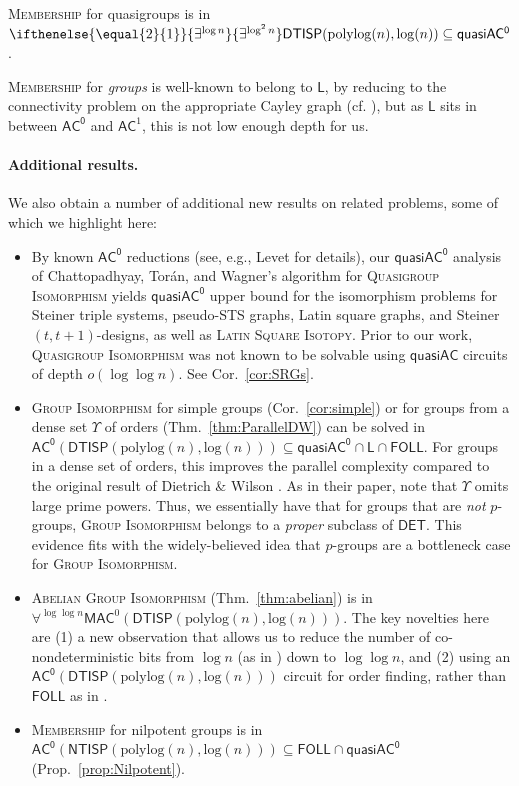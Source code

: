 \documentclass{theoretics}
\newcommand{\algprobm}[1]{\textsc{#1}\xspace}
\newcommand{\betacc}[1]{\ifthenelse{\equal{#1}{1}}{\exists^{\log n}}{\exists^{\log^{#1}n}}} %
\newcommand*{\ComplexityClass}[1]{\ensuremath{\mathsf{#1}}\xspace}
\newcommand{\NTISP}{\ComplexityClass{NTISP}}
\newcommand{\DTISP}{\ComplexityClass{DTISP}}
\newcommand{\NTISPpll}{\ensuremath{\NTISP(\mathrm{polylog}(n),\mathrm{log}(n))}\xspace}
\newcommand{\DTISPpll}{\ensuremath{\DTISP(\mathrm{polylog}(n),\mathrm{log}(n))}\xspace}
\newcommand*{\LogSpace}{\ComplexityClass{L}}
\newcommand{\AC}{\ComplexityClass{AC}}
\newcommand{\ACz}{\ComplexityClass{AC^0}}
\newcommand{\qACz}{\ComplexityClass{quasiAC^0}}
\newcommand{\FOLL}{\ComplexityClass{FOLL}}
\begin{document}
\begin{theorem} \label{thm:main-cqm}
\algprobm{Membership} for quasigroups is in $\betacc{2}\DTISPpll \subseteq \qACz$.
\end{theorem}

 \algprobm{Membership} for \emph{groups} is well-known to belong to $\LogSpace$, by reducing to the connectivity problem on the appropriate Cayley graph (cf. \cite{BarringtonMcKenzie, Reingold}), but as $\LogSpace$ sits in between $\ACz$ and $\AC^1$, this is not low enough depth for us.

\paragraph{Additional results.} We also obtain a number of additional new results on related problems, some of which we highlight here:
\begin{itemize}
\item 
By known $\ACz$ reductions (see, e.g., Levet \cite{LevetLatinSquares} for details), our $\qACz$ analysis of Chattopadhyay, Torán, and Wagner's algorithm for \algprobm{Quasigroup Isomorphism} yields $\qACz$ upper bound for the isomorphism problems for Steiner triple systems, pseudo-STS graphs, Latin square graphs, and Steiner $(t,t+1)$-designs, as well as \algprobm{Latin Square Isotopy}. Prior to our work, \algprobm{Quasigroup Isomorphism} was not known to be solvable using $\mathsf{quasiAC}$ circuits of depth $o(\log \log n)$. See Cor.~\ref{cor:SRGs}.

\item \algprobm{Group Isomorphism} for simple groups (Cor.~\ref{cor:simple}) or for groups from a dense set $\Upsilon$ of orders (Thm.~\ref{thm:ParallelDW}) can be solved in $\ACz(\DTISPpll) \subseteq \qACz \cap \LogSpace \cap \FOLL$. For groups in a dense set of orders, this improves the parallel complexity compared to the original result of Dietrich \& Wilson \cite{DietrichWilson}. As in their paper, note that $\Upsilon$ omits large prime powers. Thus, we essentially have that for groups that are \textit{not} $p$-groups, \algprobm{Group Isomorphism} belongs to a \textit{proper} subclass of $\mathsf{DET}$. This evidence fits with the widely-believed idea that $p$-groups are a bottleneck case for \algprobm{Group Isomorphism}.

\item \algprobm{Abelian Group Isomorphism} (Thm.~\ref{thm:abelian}) is in $\forall^{\log \log n} \mathsf{MAC}^0(\DTISPpll)$. The key novelties here are (1) a new observation that allows us to reduce the number of co-nondeterministic bits from $\log n$ (as in \cite{GrochowLevetWL}) down to $\log \log n$, and (2) using an \\ $\ACz(\DTISPpll)$ circuit for order finding, rather than $\FOLL$ as in \cite{ChattopadhyayToranWagner}.

\item \algprobm{Membership} for nilpotent groups is in $\ACz(\NTISPpll) \subseteq \FOLL \cap\qACz$ (Prop.~\ref{prop:Nilpotent}).

\end{itemize}
\end{document}
